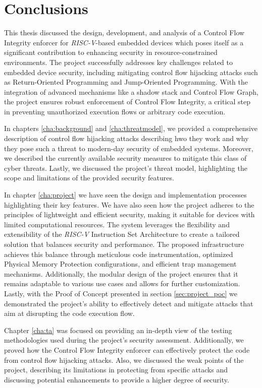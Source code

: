 \chapter{Conclusions}
\label{cha:conclusions}

This thesis discussed the design, development, and analysis of a Control Flow
Integrity enforcer for \textit{RISC-V}-based embedded devices which poses itself
as a significant contribution to enhancing security in resource-constrained environments.
The project successfully addresses key challenges related to embedded device
security, including mitigating control flow hijacking attacks such as Return-Oriented
Programming and Jump-Oriented Programming. With the integration of advanced
mechanisms like a shadow stack and Control Flow Graph, the project ensures robust
enforcement of Control Flow Integrity, a critical step in preventing
unauthorized execution flows or arbitrary code execution.

In chapters \ref{cha:background} and \ref{cha:threatmodel}, we provided a comprehensive
description of control flow hijacking attacks describing hwo they work and why they
pose such a threat to modern-day security of embedded systems. Moreover, we described
the currently available security measures to mitigate this class of cyber threats.
Lastly, we discussed the project's threat model, highlighting the scope and
limitations of the provided security features.

In chapter \ref{cha:project} we have seen the design and implementation
processes highlighting their key features. We have also seen how the project adheres
to the principles of lightweight and efficient security, making it suitable for
devices with limited computational resources. The system leverages the flexibility
and extensibility of the \textit{RISC-V} Instruction Set Architecture to create
a tailored solution that balances security and performance. The proposed infrastructure
achieves this balance through meticulous code instrumentation, optimized
Physical Memory Protection configurations, and efficient trap management mechanisms.
Additionally, the modular design of the project ensures that it remains adaptable
to various use cases and allows for further customization. Lastly, with the Proof
of Concept presented in section \ref{sec:project_poc} we demonstrated the project's
ability to effectively detect and mitigate attacks that aim at disrupting the code
execution flow.

Chapter \ref{cha:ta} was focused on providing an in-depth view of the testing methodologies
used during the project's security assessment. Additionally, we proved how the Control
Flow Integrity enforcer can effectively protect the code from control flow hijacking
attacks. Also, we discussed the weak points of the project, describing its
limitations in protecting from specific attacks and discussing potential
enhancements to provide a higher degree of security.

